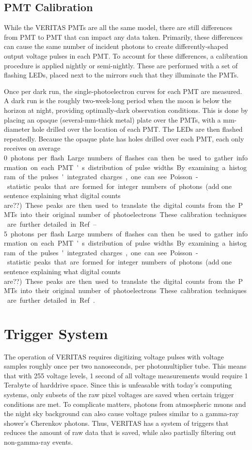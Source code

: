 \subsection{PMT Calibration}

While the VERITAS PMTs are all the same model, there are still differences from PMT to PMT that can impact any data taken.
Primarily, these differences can cause the same number of incident photons to create differently-shaped output voltage pulses in each PMT.
To account for these differences, a calibration procedure is applied nightly or semi-nightly.
These are performed with a set of flashing LEDs, placed next to the mirrors such that they illuminate the PMTs.

Once per dark run, the single-photoelectron curves for each PMT are measured.
A dark run is the roughly two-week-long period when the moon is below the horizon at night, providing optimally-dark observation conditions.
This is done by placing an opaque (several-mm-thick metal) plate over the PMTs, with a mm-diameter hole drilled over the location of each PMT.
The LEDs are then flashed repeatedly.
Because the opaque plate has holes drilled over each PMT, each only receives on average \SIrange{0}{5} photons per flash.
Large numbers of flashes can then be used to gather information on each PMT's distribution of pulse widths.
By examining a histogram of the pulses' integrated charges, one can see Poisson-statistic peaks that are formed for integer numbers of photons.
{\color{red}(add one sentence explaining what digital counts are??)}
These peaks are then used to translate the digital counts from the PMTs into their original number of photoelectrons.
These calibration techniques are further detailed in Ref.~\cite{calib_techniques}.


\section{Trigger System}\label{sec:trig}

The operation of VERITAS requires digitizing voltage pulses with voltage samples roughly once per two nanoseconds, per photomultiplier tube.
This means that with 255 voltage levels, 1 second of all voltage measurements would require 1 Terabyte of harddrive space.
Since this is unfeasable with today's computing systems, only subsets of the raw pixel voltages are saved when certain trigger conditions are met.
To complicate matters, photons from atmospheric muons and the night sky background can also cause voltage pulses similar to a gamma-ray shower's Cherenkov photons.
Thus, VERITAS has a system of triggers that reduces the amount of raw data that is saved, while also partially filtering out non-gamma-ray events.

